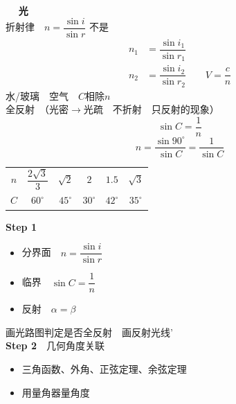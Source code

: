 \textbf{光}\\[0.8ex]
折射律　$n=\dfrac{\sin i}{\sin r}$
不是
\begin{align*}
n_1&=\dfrac{\sin i_1}{\sin r_1}\\
n_2&=\dfrac{\sin i_2}{\sin r_2}\qquad V=\dfrac{c}{n}
\end{align*}
水/玻璃　空气　$C$相除$n$\\
全反射　（光密$\to$光疏　不折射　只反射的现象）
\[
\sin C=\dfrac{1}{n}
\]
\[
n=\dfrac{\sin 90^\circ}{\sin C}=\dfrac{1}{\sin C}
\]
\begin{center}
\begin{tabular}{cccccc}
$n$ & $\dfrac{2\sqrt{3}}{3}$ & $\sqrt{2}$ & $2$ & $1.5$ & $\sqrt{3}$\\[1.2ex]
$C$ & $60^\circ$ & $45^\circ$ & $30^\circ$ & $42^\circ$ & $35^\circ$
\end{tabular}
\end{center}
\textbf{Step 1}
\begin{itemize}
\item 分界面　$n=\dfrac{\sin i}{\sin r}$
\item 临界　$\sin C=\dfrac{1}{n}$
\item 反射　$\alpha=\beta$
\end{itemize}
画光路图判定是否全反射　画反射光线'\\[0.8ex]
\textbf{Step 2}　几何角度关联
\begin{itemize}
\item 三角函数、外角、正弦定理、余弦定理　
\item 用量角器量角度
\end{itemize}
